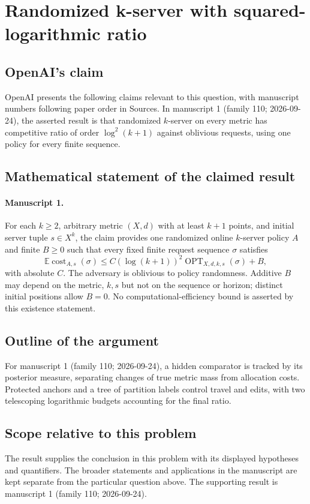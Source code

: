 \documentclass[11pt]{article}
\begin{document}
\section*{Randomized k-server with squared-logarithmic ratio}

\subsection{OpenAI's claim}
OpenAI presents the following claims relevant to this question, with manuscript numbers following paper order in Sources. In manuscript 1 (family 110; 2026-09-24), the asserted result is that randomized $k$-server on every metric has competitive ratio of order $\log^2(k+1)$ against oblivious requests, using one policy for every finite sequence.

\subsection{Mathematical statement of the claimed result}
\paragraph{Manuscript 1.}
For each $k\ge2$, arbitrary metric $(X,d)$ with at least $k+1$ points, and initial server tuple $s\in X^k$, the claim provides one randomized online $k$-server policy $A$ and finite $B\ge0$ such that every fixed finite request sequence $\sigma$ satisfies
\[
 \mathbb E\operatorname{cost}_{A,s}(\sigma)
 \le C(\log(k+1))^2\operatorname{OPT}_{X,d,k,s}(\sigma)+B,
\]
with absolute $C$. The adversary is oblivious to policy randomness. Additive $B$ may depend on the metric, $k,s$ but not on the sequence or horizon; distinct initial positions allow $B=0$. No computational-efficiency bound is asserted by this existence statement.

\subsection{Outline of the argument}
For manuscript 1 (family 110; 2026-09-24), a hidden comparator is tracked by its posterior measure, separating changes of true metric mass from allocation costs. Protected anchors and a tree of partition labels control travel and edits, with two telescoping logarithmic budgets accounting for the final ratio.

\subsection{Scope relative to this problem}
The result supplies the conclusion in this problem with its displayed hypotheses and quantifiers. The broader statements and applications in the manuscript are kept separate from the particular question above. The supporting result is manuscript 1 (family 110; 2026-09-24).
\end{document}
